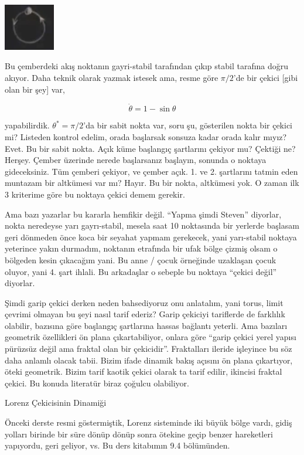 \documentclass[12pt,fleqn]{article}\usepackage{../../common}
\begin{document}
\includegraphics[width=6em]{18_03.png}

Bu çemberdeki akış noktanın gayri-stabil tarafından çıkıp stabil tarafına
doğru akıyor. Daha teknik olarak yazmak istesek ama, resme göre $\pi/2$'de
bir çekici [gibi olan bir şey] var, 

$$ \dot{\theta} = 1 - \sin\theta $$

yapabilirdik. $\theta^\ast = \pi/2$'da bir sabit nokta var, soru şu,
gösterilen nokta bir çekici mi? Listeden kontrol edelim, orada başlarsak
sonsuza kadar orada kalır mıyız? Evet. Bu bir sabit nokta. Açık küme
başlangıç şartlarını çekiyor mu? Çektiği ne? Herşey. Çember üzerinde nerede
başlarsanız başlayın, sonunda o noktaya gideceksiniz. Tüm çemberi çekiyor,
ve çember açık. 1. ve 2. şartlarını tatmin eden muntazam bir altkümesi var
mı? Hayır. Bu bir nokta, altkümesi yok. O zaman ilk 3 kriterime göre bu
noktaya çekici demem gerekir.

Ama bazı yazarlar bu kararla hemfikir değil. ``Yapma şimdi Steven''
diyorlar, nokta neredeyse yarı gayrı-stabil, mesela saat 10 noktasında bir
yerlerde başlasam geri dönmeden önce koca bir seyahat yapmam gerekecek,
yani yarı-stabil noktaya yeterince yakın durmadım, noktanın etrafında bir
ufak bölge çizmiş olsam o bölgeden kesin çıkacağım yani. Bu anne / çocuk
örneğinde uzaklaşan çocuk oluyor, yani 4. şart ihlali. Bu arkadaşlar o
sebeple bu noktaya ``çekici değil'' diyorlar. 

Şimdi garip çekici derken neden bahsediyoruz onu anlatalım, yani torus,
limit çevrimi olmayan bu şeyi nasıl tarif ederiz? Garip çekiciyi tariflerde
de farklılık olabilir, bazısına göre başlangıç şartlarına hassas bağlantı
yeterli. Ama bazıları geometrik özellikleri ön plana çıkartabiliyor, onlara
göre ``garip çekici yerel yapısı pürüzsüz değil ama fraktal olan bir
çekicidir''.  Fraktalları ileride işleyince bu söz daha anlamlı olacak
tabii. Bizim ifade dinamik bakış açısını ön plana çıkartıyor, öteki
geometrik. Bizim tarif kaotik çekici olarak ta tarif edilir, ikincisi
fraktal çekici. Bu konuda literatür biraz çoğulcu olabiliyor. 

Lorenz Çekicisinin Dinamiği

Önceki derste resmi göstermiştik, Lorenz sisteminde iki büyük bölge
vardı, gidiş yolları birinde bir süre dönüp dönüp sonra ötekine geçip
benzer hareketleri yapıyordu, geri geliyor, vs. Bu ders kitabımın 9.4
bölümünden. 
\end{document}
